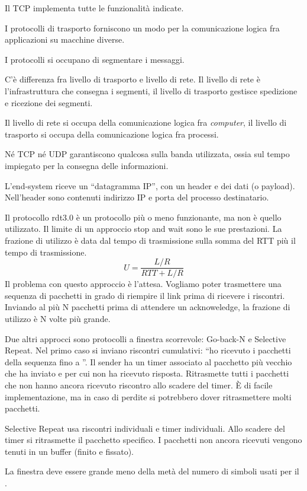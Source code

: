 Il TCP implementa tutte le funzionalit\`a indicate.

I protocolli di trasporto forniscono un modo per la comunicazione logica fra applicazioni su macchine diverse.

I protocolli si occupano di segmentare i messaggi.

C'\`e differenza fra livello di trasporto e livello di rete. Il livello di rete \`e l'infrastruttura che consegna i segmenti, il livello di trasporto gestisce spedizione e ricezione dei segmenti.

Il livello di rete si occupa della comunicazione logica fra \emph{computer}, il livello di trasporto si occupa della comunicazione logica fra processi.

N\'e TCP n\'e UDP garantiscono qualcosa sulla banda utilizzata, ossia sul tempo impiegato per la consegna delle informazioni.

L'end-system riceve un ``datagramma IP'', con un header e dei dati (o payload). Nell'header sono contenuti indirizzo IP e porta del processo destinatario.

Il protocollo rdt3.0 \`e un protocollo pi\`u o meno funzionante, ma non \`e quello utilizzato. Il limite di un approccio stop and wait sono le sue prestazioni. La frazione di utilizzo \`e data dal tempo di trasmissione sulla somma del RTT pi\`u il tempo di trasmissione.
\[
U = \frac{L / R}{RTT + L / R}
\]
Il problema con questo approccio \`e l'attesa. Vogliamo poter trasmettere una sequenza di pacchetti in grado di riempire il link prima di ricevere i riscontri. Inviando al pi\`u N pacchetti prima di attendere un acknoweledge, la frazione di utilizzo \`e N volte pi\`u grande.

Due altri approcci sono protocolli a finestra scorrevole: Go-back-N e Selective Repeat. Nel primo caso si inviano riscontri cumulativi: ``ho ricevuto i pacchetti della sequenza fino a ''. Il sender ha un timer associato al pacchetto pi\`u vecchio che ha inviato e per cui non ha ricevuto risposta. Ritrasmette tutti i pacchetti che non hanno ancora ricevuto riscontro allo scadere del timer. \`E di facile implementazione, ma in caso di perdite si potrebbero dover ritrasmettere molti pacchetti.

Selective Repeat usa riscontri individuali e timer individuali. Allo scadere del timer si ritrasmette il pacchetto specifico. I pacchetti non ancora ricevuti vengono tenuti in un buffer (finito e fissato).

La finestra deve essere grande meno della met\`a del numero di simboli usati per il .

